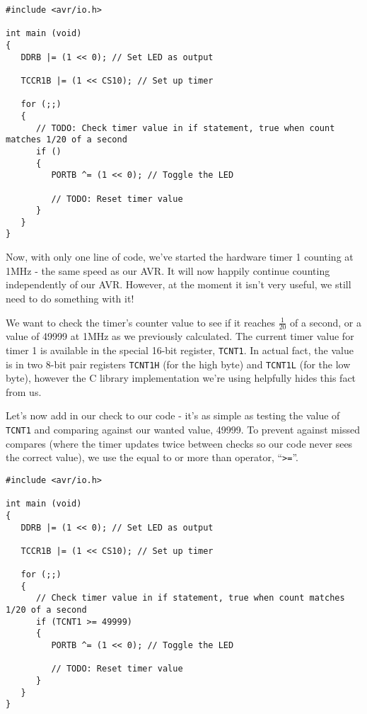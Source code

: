 \documentclass[a4paper,oneside,notitlepage]{book}
\begin{document}
\begin{center}
\begin{lstlisting}
#include <avr/io.h>

int main (void)
{
   DDRB |= (1 << 0); // Set LED as output

   TCCR1B |= (1 << CS10); // Set up timer

   for (;;)
   {
      // TODO: Check timer value in if statement, true when count matches 1/20 of a second
      if ()
      {
         PORTB ^= (1 << 0); // Toggle the LED

         // TODO: Reset timer value
      }
   }
}
\end{lstlisting}
\end{center}

Now, with only one line of code, we've started the hardware timer 1 counting at 1MHz - the same speed as our AVR. It will now happily continue counting independently of our AVR. However, at the moment it isn't very useful, we still need to do something with it!

We want to check the timer's counter value to see if it reaches \(\frac{1}{20}\) of a second, or a value of 49999 at 1MHz as we previously calculated. The current timer value for timer 1 is available in the special 16-bit register, \texttt{TCNT1}. In actual fact, the value is in two 8-bit pair registers \texttt{TCNT1H} (for the high byte) and \texttt{TCNT1L} (for the low byte), however the C library implementation we're using helpfully hides this fact from us.

Let's now add in our check to our code - it's as simple as testing the value of \texttt{TCNT1} and comparing against our wanted value, 49999. To prevent against missed compares (where the timer updates twice between checks so our code never sees the correct value), we use the equal to or more than operator, ``\texttt{>=}''.

\begin{center}
\begin{lstlisting}
#include <avr/io.h>

int main (void)
{
   DDRB |= (1 << 0); // Set LED as output

   TCCR1B |= (1 << CS10); // Set up timer

   for (;;)
   {
      // Check timer value in if statement, true when count matches 1/20 of a second
      if (TCNT1 >= 49999)
      {
         PORTB ^= (1 << 0); // Toggle the LED

         // TODO: Reset timer value
      }
   }
}
\end{lstlisting}
\end{center}
\end{document}
